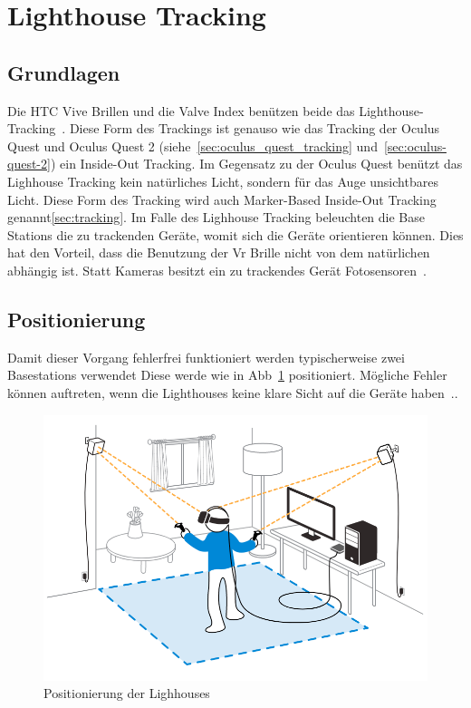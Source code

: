 \section{Lighthouse Tracking}\label{sec:lighthouse_tracking}

\subsection{Grundlagen}

Die HTC Vive Brillen und die Valve Index benützen beide das Lighthouse-Tracking~\cite{steam_lighhouse_versions}.
Diese Form des Trackings ist genauso wie das Tracking der Oculus Quest und Oculus Quest 2 (siehe~\ref{sec:oculus_quest_tracking} und~\ref{sec:oculus-quest-2}) ein Inside-Out Tracking.
Im Gegensatz zu der Oculus Quest benützt das Lighhouse Tracking kein natürliches Licht, sondern für das Auge unsichtbares Licht.
Diese Form des Tracking wird auch Marker-Based Inside-Out Tracking genannt\ref{sec:tracking}.
Im Falle des Lighhouse Tracking beleuchten die Base Stations die zu trackenden Geräte, womit sich die Geräte orientieren können.
Dies hat den Vorteil, dass die Benutzung der Vr Brille nicht von dem natürlichen abhängig ist.
Statt Kameras besitzt ein zu trackendes Gerät Fotosensoren~\cite{Buckley_2015}.

\subsection{Positionierung}

Damit dieser Vorgang fehlerfrei funktioniert werden typischerweise zwei Basestations verwendet
Diese werde wie in Abb~\ref{fig:basetstation_positioning} positioniert.
Mögliche Fehler können auftreten, wenn die Lighthouses keine klare Sicht auf die Geräte haben~\cite{steam_lighhouse_versions}..

\begin{figure}
    \centering
    \includegraphics[scale=0.4]{pics/basestations_positioning}
    \caption{Positionierung der Lighhouses~\cite{Sercan_2018}}
    \label{fig:basetstation_positioning}
\end{figure}

